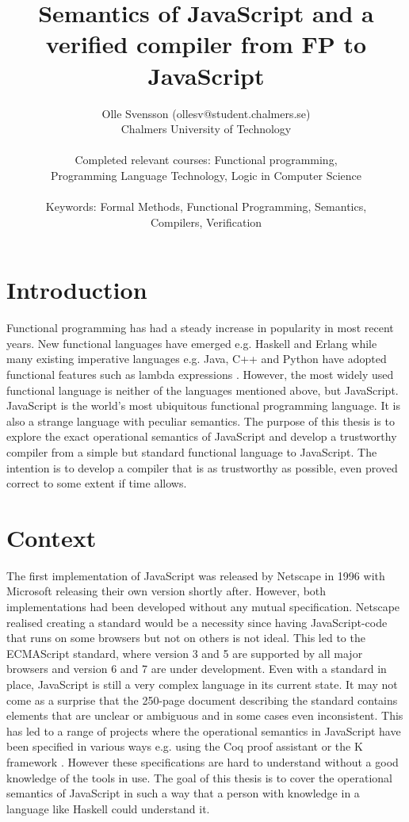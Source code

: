 \documentclass [11pt]{article}
\title{Semantics of JavaScript and a verified compiler from FP to JavaScript}
\author{Olle Svensson (ollesv@student.chalmers.se) \\
		Chalmers University of Technology \\ \\
		Completed relevant courses: Functional programming, \\
		Programming Language Technology, Logic in Computer Science \\ \\
		Keywords: Formal Methods, Functional Programming, Semantics, \\
		Compilers, Verification}
\begin{document}
\maketitle

\section{Introduction}
Functional programming has had a steady increase in popularity in most recent years. New functional languages have emerged e.g. Haskell and Erlang while many existing imperative languages e.g. Java, C++ and Python have adopted functional features such as lambda expressions \cite{how}. However, the most widely used functional language is neither of the languages mentioned above, but JavaScript. JavaScript is the world's most ubiquitous functional programming language. It is also a strange language with peculiar semantics. The purpose of this thesis is to explore the exact operational semantics of JavaScript and develop a trustworthy compiler from a simple but standard functional language to JavaScript. The intention is to develop a compiler that is as trustworthy as possible, even proved correct to some extent if time allows.

\section{Context}
The first implementation of JavaScript was released by Netscape in 1996 with Microsoft releasing their own version shortly after. However, both implementations had been developed without any mutual specification. Netscape realised creating a standard would be a necessity since having JavaScript-code that runs on some browsers but not on others is not ideal. This led to the ECMAScript standard, where version 3 and 5 are supported by all major browsers and version 6 and 7 are under development. Even with a standard in place, JavaScript is still a very complex language in its current state. It may not come as a surprise that the 250-page document describing the standard contains elements that are unclear or ambiguous and in some cases even inconsistent. This has led to a range of projects where the operational semantics in JavaScript have been specified in various ways e.g. using the Coq proof assistant or the K framework \cite{coq, kframe}. However these specifications are hard to understand without a good knowledge of the tools in use. The goal of this thesis is to cover the operational semantics of JavaScript in such a way that a person with knowledge in a language like Haskell could understand it.
\end{document}
